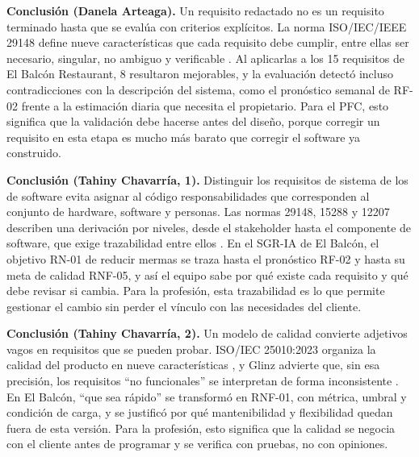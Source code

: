 
\textbf{Conclusión (Danela Arteaga).} Un requisito redactado no es un requisito terminado hasta que se evalúa con criterios explícitos. La norma ISO/IEC/IEEE 29148 define nueve características que cada requisito debe cumplir, entre ellas ser necesario, singular, no ambiguo y verificable \cite[\nopp cl.~5.2.5]{ieee29148}. Al aplicarlas a los 15 requisitos de El Balcón Restaurant, 8 resultaron mejorables, y la evaluación detectó incluso contradicciones con la descripción del sistema, como el pronóstico semanal de RF-02 frente a la estimación diaria que necesita el propietario. Para el PFC, esto significa que la validación debe hacerse antes del diseño, porque corregir un requisito en esta etapa es mucho más barato que corregir el software ya construido.

\textbf{Conclusi\'on (Tahiny Chavarr\'ia, 1).} Distinguir los requisitos de sistema de los de software evita asignar al c\'odigo responsabilidades que corresponden al conjunto de hardware, software y personas. Las normas 29148, 15288 y 12207 describen una derivaci\'on por niveles, desde el stakeholder hasta el componente de software, que exige trazabilidad entre ellos \cite{ieee29148,iso15288,iso12207}. En el SGR-IA de El Balc\'on, el objetivo RN-01 de reducir mermas se traza hasta el pron\'ostico RF-02 y hasta su meta de calidad RNF-05, y as\'i el equipo sabe por qu\'e existe cada requisito y qu\'e debe revisar si cambia. Para la profesi\'on, esta trazabilidad es lo que permite gestionar el cambio sin perder el v\'inculo con las necesidades del cliente.

\textbf{Conclusi\'on (Tahiny Chavarr\'ia, 2).} Un modelo de calidad convierte adjetivos vagos en requisitos que se pueden probar. ISO/IEC 25010:2023 organiza la calidad del producto en nueve caracter\'isticas \cite{iso25010}, y Glinz advierte que, sin esa precisi\'on, los requisitos ``no funcionales'' se interpretan de forma inconsistente \cite{glinz2007}. En El Balc\'on, ``que sea r\'apido'' se transform\'o en RNF-01, con m\'etrica, umbral y condici\'on de carga, y se justific\'o por qu\'e mantenibilidad y flexibilidad quedan fuera de esta versi\'on. Para la profesi\'on, esto significa que la calidad se negocia con el cliente antes de programar y se verifica con pruebas, no con opiniones.


